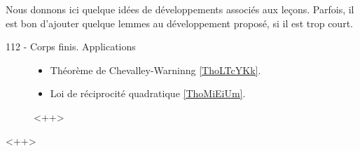 Nous donnons ici quelque idées de développements associés aux leçons. Parfois, il est bon d'ajouter quelque lemmes au développement proposé, si il est trop court.

\begin{description}
    \item[112 - Corps finis. Applications]
        \begin{itemize}
            \item Théorème de Chevalley-Warninng \ref{ThoLTcYKk}.
            \item Loi de réciprocité quadratique \ref{ThoMiEiUm}.
        \end{itemize}
        <++>
\end{description}
<++>
